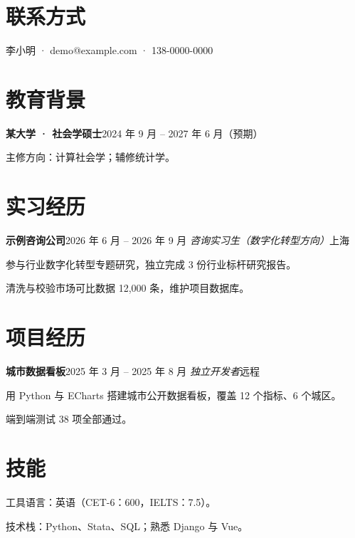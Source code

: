 \documentclass{article}
\newcommand{\resumesection}[1]{\section*{#1}}
\newcommand{\resumeentry}[2]{\textbf{#1}\hfill{#2}}
\newcommand{\resumesubentry}[2]{\textit{#1}\hfill{#2}}
\begin{document}
\resumesection{联系方式}
\item 李小明 · demo@example.com · 138-0000-0000

\resumesection{教育背景}
\resumeentry{某大学 · 社会学硕士}{2024 年 9 月 -- 2027 年 6 月（预期）}
\item 主修方向：计算社会学；辅修统计学。

\resumesection{实习经历}
\resumeentry{示例咨询公司}{2026 年 6 月 -- 2026 年 9 月}
\resumesubentry{咨询实习生（数字化转型方向）}{上海}
\item 参与行业数字化转型专题研究，独立完成 3 份行业标杆研究报告。
\item 清洗与校验市场可比数据 12,000 条，维护项目数据库。

\resumesection{项目经历}
\resumeentry{城市数据看板}{2025 年 3 月 -- 2025 年 8 月}
\resumesubentry{独立开发者}{远程}
\item 用 Python 与 ECharts 搭建城市公开数据看板，覆盖 12 个指标、6 个城区。
\item 端到端测试 38 项全部通过。

\resumesection{技能}
\item 工具语言：英语（CET-6：600，IELTS：7.5）。
\item 技术栈：Python、Stata、SQL；熟悉 Django 与 Vue。
\end{document}
